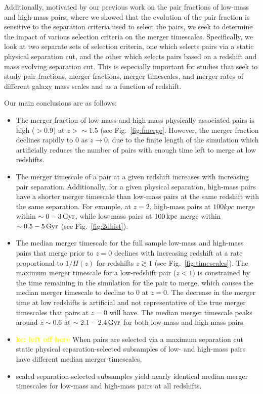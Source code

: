 \documentclass[twocolumn,linenumbers]{aastex631}
\newcommand{\kc}[1]{\textcolor{yellow}{\textbf{kc: #1}} }
\begin{document}
    Additionally, motivated by our previous work on the pair fractions of low-mass and high-mass pairs, where we showed that the evolution of the pair fraction is sensitive to the separation criteria used to select the pairs, we seek to determine the impact of various selection criteria on the merger timescales. 
    Specifically, we look at two separate sets of selection criteria, one which selects pairs via a static physical separation cut, and the other which selects pairs based on a redshift and mass evolving separation cut.
    This is especially important for studies that seek to study pair fractions, merger fractions, merger timescales, and merger rates of different galaxy mass scales and as a function of redshift. 

    Our main conclusions are as follows: 
    \begin{itemize}
        \item The merger fraction of low-mass and high-mass physically associated pairs is high ($>0.9$) at $z>\sim1.5$ (see Fig.~\ref{fig:fmerge}. However, the merger fraction declines rapidly to 0 as $z\to0$, due to the finite length of the simulation which artificially reduces the number of pairs with enough time left to merge at low redshifts. %
        \item The merger timescale of a pair at a given redshift increases with increasing pair separation. Additionally, for a given physical separation, high-mass pairs have a shorter merger timescale than low-mass pairs at the same redshift with the same separation. For example, at $z=2$, high-mass pairs at $100kpc$ merge within $\sim 0-3 \mathrm{\,Gyr}$, while low-mass pairs at $100\mathrm{\,kpc}$ merge within $\sim 0.5-5\mathrm{\,Gyr}$ (see Fig.~\ref{fig:2dhist}).
        \item The median merger timescale for the full sample low-mass and high-mass pairs that merge prior to $z=0$ declines with increasing redshift at a rate proportional to $1/H(z)$ for redshifts $z\gtrsim1$ (see Fig.~\ref{fig:timescales}). 
        The maximum merger timescale for a low-redshift pair ($z<1$) is constrained by the time remaining in the simulation for the pair to merge, which causes the median merger timescale to decline to 0 at $z=0$. 
        The decrease in the merger time at low redshifts is artificial and not representative of the true merger timescales that pairs at $z=0$ will have.
        The median merger timescale peaks around $z\sim0.6$ at $\sim2.1-2.4\mathrm{\,Gyr}$ for both low-mass and high-mass pairs.
        \item \kc{left off here}When pairs are selected via a maximum separation cut
        static physical separation-selected subsamples of low- and high-mass pairs have different median merger timescales.
        \item scaled separation-selected subsamples yield nearly identical median merger timescales for low-mass and high-mass pairs at all redshifts. 
    \end{itemize}
    
\end{document}
